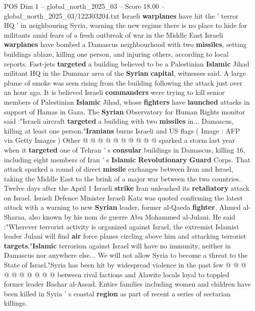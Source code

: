 \begin{textsample}{POS Dim 1 – global\_north\_2025\_03 – Score 18.00 – global\_north\_2025\_03/122303204.txt}  \label{ex:f1_pos_425}
Israeli \textbf{warplanes} have hit the ' terror HQ ' in neighbouring Syria, warning the new regime there is no place to hide for militants amid fears of a fresh outbreak of war in the Middle East Israeli \textbf{warplanes} have bombed a Damascus neighbourhood with two \textbf{missiles}, setting buildings ablaze, killing one person, and injuring others, according to local reports.
Fast-jets \textbf{targeted} a building believed to be a Palestinian \textbf{Islamic} Jihad militant HQ in the Dummar area of the \textbf{Syrian} \textbf{capital}, witnesses said.
A large plume of smoke was seen rising from the building following the attack just over an hour ago.
It is believed Israeli \textbf{commanders} were trying to kill senior members of Palestinian \textbf{Islamic} Jihad, whose \textbf{fighters} have \textbf{launched} attacks in support of Hamas in Gaza.
The \textbf{Syrian} Observatory for Human Rights monitor said :"Israeli aircraft \textbf{targeted} a building with two \textbf{missiles} in...
Damascus, killing at least one person."\textbf{Iranians} burns Israeli and US flags ( Image : AFP via Getty Images ) Other @ @ @ @ @ @ @ @ @ @ sparked a storm last year when it \textbf{targeted} one of Tehran ' s \textbf{consular} buildings in Damascus, killing 16, including eight members of Iran ' s \textbf{Islamic} \textbf{Revolutionary} \textbf{Guard} Corps.
That attack sparked a round of direct \textbf{missile} exchanges between Iran and Israel, taking the Middle East to the brink of a major war between the two countries.
Twelve days after the April 1 Israeli \textbf{strike} Iran unleashed its \textbf{retaliatory} attack on Israel.
Israeli Defence Minister Israeli Katz was quoted confirming the latest attack with a warning to new \textbf{Syrian} leader, former al-Qaeda \textbf{fighter}, Ahmed al-Sharaa, also known by his nom de guerre Abu Mohammed al-Julani.
He said :"Wherever terrorist activity is organized against Israel, the extremist Islamist leader Julani will find \textbf{air} force planes circling above him and attacking terrorist \textbf{targets}."\textbf{Islamic} terrorism against Israel will have no immunity, neither in Damascus nor anywhere else...
We will not allow Syria to become a threat to the State of Israel."Syria has been hit by widespread violence in the past few @ @ @ @ @ @ @ @ @ @ between rival factions and Alawite locals loyal to toppled former leader Bashar al-Assad.
Entire families including women and children have been killed in Syria ' s coastal \textbf{region} as part of recent a series of sectarian killings.

\end{textsample}
